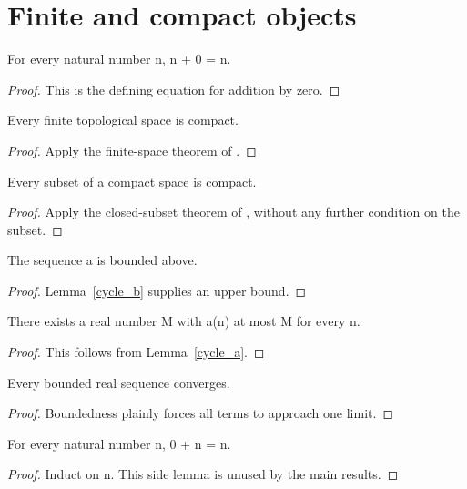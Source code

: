 \section{Finite and compact objects}
\begin{theorem}\label{correct}
For every natural number n, n + 0 = n.
\end{theorem}
\begin{proof}This is the defining equation for addition by zero.\end{proof}

\begin{theorem}\label{citation_good}
Every finite topological space is compact.
\end{theorem}
\begin{proof}Apply the finite-space theorem of \cite{finite}.\end{proof}

\begin{theorem}\label{citation_missing}
Every subset of a compact space is compact.
\end{theorem}
\begin{proof}Apply the closed-subset theorem of \cite{closed}, without any further condition on the subset.\end{proof}

\begin{lemma}\label{cycle_a}
The sequence a is bounded above.
\end{lemma}
\begin{proof}Lemma~\ref{cycle_b} supplies an upper bound.\end{proof}
\begin{lemma}\label{cycle_b}
There exists a real number M with a(n) at most M for every n.
\end{lemma}
\begin{proof}This follows from Lemma~\ref{cycle_a}.\end{proof}

\begin{theorem}\label{unsupported}
Every bounded real sequence converges.
\end{theorem}
\begin{proof}Boundedness plainly forces all terms to approach one limit.\end{proof}

\begin{lemma}\label{side}
For every natural number n, 0 + n = n.
\end{lemma}
\begin{proof}Induct on n. This side lemma is unused by the main results.\end{proof}

